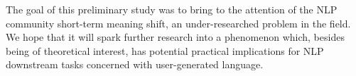 

The goal of this preliminary study was to bring to the attention of the NLP community short-term meaning shift, an under-researched problem in the field. 
We hope that it will spark further research into a phenomenon which, besides being of theoretical interest, has potential practical implications for NLP downstream tasks concerned with user-generated language.



